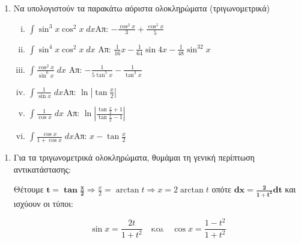 \begin{enumerate}
\item Να υπολογιστούν τα παρακάτω αόριστα ολοκληρώματα (τριγωνομετρικά)
  \begin{enumerate}[i)]
\item $\int\sin^3x\cos^2x\; dx$\hfill Απ: $-\frac{\cos^3x}{3}+\frac{\cos^5x}{5}$
\item $\int\sin^4x\cos^2x\; dx$
  \hfill Απ: $\frac{1}{16}x-\frac{1}{64}\sin 4x-\frac{1}{48}\sin^32x$
\item $\int\frac{\cos^2x}{\sin^6x}\; dx$
  \hfill Απ: $-\frac{1}{5\tan^5x}-\frac{1}{\tan^3x}$
\item $\int\frac{1}{\sin x}\; dx$\hfill Απ: $\ln\left|\tan\frac{x}{2}\right|$
\item $\int\frac{1}{\cos x}\; dx$
  \hfill Απ: $\ln\left|\frac{\tan\frac{x}{2}+1}{\tan\frac{x}{2}-1}\right|$
\item $ \int\frac{\cos x}{1+\cos x}\; dx$\hfill Απ: $x-\tan\frac{x}{2}$
\end{enumerate}
\end{enumerate}

\begin{center}
  \minibox{\large\bfseries \textcolor{Col1}{Παρατηρήσεις-Υποδείξεις}}
\end{center}

\vspace{\baselineskip}

\begin{enumerate}
  \item Για τα τριγωνομετρικά ολοκληρώματα, θυμάμαι τη γενική περίπτωση αντικατάστασης: 
    \begin{center}
      Θέτουμε $ \boldsymbol{t = \tan{\frac{x}{2}}} \Rightarrow \frac{x}{2} = \arctan{t} 
      \Rightarrow x = 2 \arctan {t} $ οπότε $ \boldsymbol{dx = \frac{2}{1 + t^{2}} dt} $ 
      και ισχύουν οι τύποι:
    \end{center}
    \[
      \boxed{\sin x=\frac{2t}{1+t^2}} \quad \text{και} \quad \boxed{\cos x
      =\frac{1-t^2}{1+t^2}}
    \] 
\end{enumerate}


